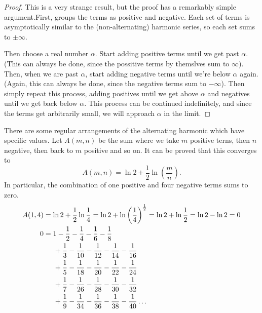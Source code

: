 \documentclass[fleqn]{report}
\begin{document}
\begin{proof}
This is a very strange result, but the proof has a remarkably
simple argument.First, groups the terms as positive and
negative. Each set of terms is asymptotically similar to the
(non-alternating) harmonic series, so each set sums to $\pm
\infty$.

Then choose a real number $\alpha$. Start adding positive
terms until we get past $\alpha$. (This can always be done,
since the possitive terms by themslves sum to $\infty$).
Then, when we are past $\alpha$, start adding negative terms
until we're below $\alpha$ again. (Again, this can always be
done, since the negative terms sum to $-\infty$). Then simply
repeat this process, adding positives until we get above
$\alpha$ and negatives until we get back below $\alpha$. This
process can be continued indefinitely, and since the terms get
arbitrarily small, we will approach $\alpha$ in the limit.
\end{proof}

\begin{example}
There are some regular arrangements of the alternating
harmonic which have specific values. Let $A(m,n)$ be the sum
where we take $m$ positive terns, then $n$ negative, then back
to $m$ positive and so on. It can be proved that this
converges to
\begin{equation*}
A(m,n) = \ln 2 + \frac{1}{2} \ln \left( \frac{m}{n} \right) .
\end{equation*}
In particular, the combination of one positive and four
negative terms sums to zero.
\begin{align*}
A(1,4) & = \ln 2 + \frac{1}{2} \ln \frac{1}{4} = \ln 2 + \ln
\left( \frac{1}{4} \right)^{\frac{1}{2}} = \ln 2 + \ln
\frac{1}{2} = \ln 2 - \ln 2 = 0 \\
0 & = 1 - \frac{1}{2} - \frac{1}{4} - \frac{1}{6} - \frac{1}{8} \\
& \hspace{0.5cm} + \frac{1}{3} - \frac{1}{10} - \frac{1}{12} -
\frac{1}{14} - \frac{1}{16} \\
& \hspace{0.5cm} + \frac{1}{5} - \frac{1}{18} - \frac{1}{20} -
\frac{1}{22} - \frac{1}{24} \\
& \hspace{0.5cm} + \frac{1}{7} - \frac{1}{26} - \frac{1}{28} -
\frac{1}{30} - \frac{1}{32} \\
& \hspace{0.5cm} + \frac{1}{9} - \frac{1}{34} - \frac{1}{36} -
\frac{1}{38} - \frac{1}{40} \ldots 
\end{align*}
\end{example}
\end{document}
